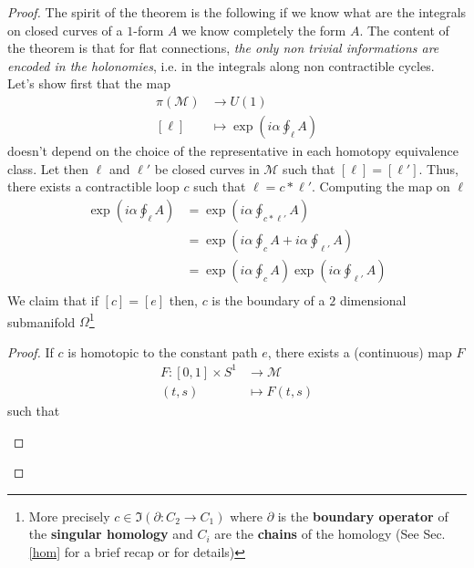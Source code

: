 \documentclass[11pt]{article}
\theoremstyle{definition}
\numberwithin{equation}{section}
\begin{document}
\begin{proof}
The spirit of the theorem is the following if we know what are the integrals on closed curves of a $1$-form $A$ we know completely the form $A$. The content of the theorem  is that for flat connections, \textit{the only non trivial informations are encoded in the holonomies}, i.e. in the integrals along non contractible cycles. \\
Let's show first that the map
\begin{equation}
    \begin{aligned}
 \pi(\mathcal{M}) &\to U(1)\\
 [\ell] &\mapsto \exp(i \alpha \oint_{\ell} A)
    \end{aligned}
\end{equation}
doesn't depend on the choice of the representative in each homotopy equivalence class. Let then $\ell$ and $\ell'$ be closed curves in $\mathcal{M}$ such that $[\ell] = [\ell']$. Thus, there exists a contractible loop $c$ such that $\ell = c * \ell'$. Computing the map on $\ell$
\begin{equation}
    \begin{aligned}
        \exp(i \alpha \oint_{\ell} A) &=   \exp(i \alpha \oint_{c * \ell'} A)\\
        &= \exp(i \alpha \oint_{c } A + i \alpha\oint_{\ell'} A)\\
        &= \exp(i \alpha \oint_{c } A) \exp(i \alpha\oint_{\ell'} A)\\  
    \end{aligned}
\end{equation}
We claim that if $[c]=[e]$ then, $c$ is the boundary of a $2$ dimensional submanifold $\Omega$\footnote{More precisely $c \in \Im (\partial: C_2 \to C_1)$ where $\partial$ is the \textbf{boundary operator} of the \textbf{singular homology} and $C_i$ are the \textbf{chains} of the homology (See Sec. \ref{hom} for a brief recap or \cite[Section 2.1]{Hat} for details)}
\begin{proof}
    If $c$ is homotopic to the constant path $e$, there exists a (continuous) map $F$
    \begin{equation}
    \begin{aligned}
        F: [0,1] \times S^1 &\to \mathcal{M}\\
            (t,s) &\mapsto F(t,s)
        \end{aligned}
    \end{equation}
    such that
    \begin{enumerate}

\end{enumerate}
\end{proof}
\end{proof}
\end{document}
